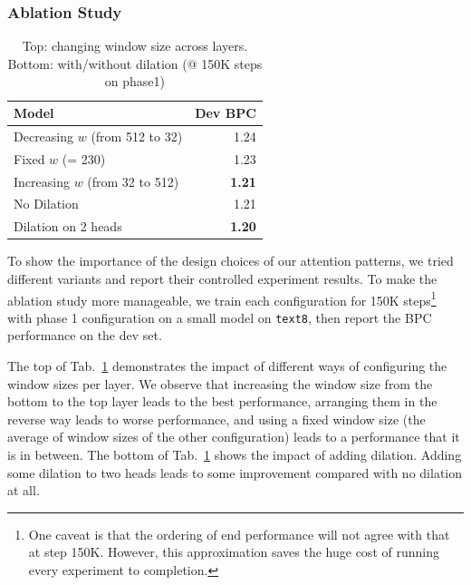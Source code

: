 \subsubsection{Ablation Study}

\begin{table}[t]
    \centering
    \small
    \begin{tabular}{@{}lr@{}}
    \toprule
    Model & Dev BPC \\
    \midrule
    Decreasing $w$ (from 512 to 32) & 1.24 \\
    Fixed $w$ (= 230) &  1.23 \\
    Increasing $w$ (from 32 to 512) &\textbf{ 1.21} \\
    \midrule
    No Dilation &  1.21 \\
    Dilation on 2 heads &  \textbf{1.20} \\
    \bottomrule
    \end{tabular}
    \caption{Top: changing window size
    across layers. Bottom: with/without dilation (@ 150K steps on phase1)}
    \label{tab:ablation_charlm}
\end{table}






To show the importance of the design choices of our attention patterns, we tried different variants and report their controlled experiment results. 
To make the ablation study more manageable, we train each configuration for 150K steps\footnote{
One caveat is that the ordering of end performance will not agree with that at step 150K.
However, this approximation saves the huge cost of running every experiment to completion.}
with phase 1 configuration on a small model on \texttt{text8}, then report the BPC performance on the dev set. 

The top of Tab.~\ref{tab:ablation_charlm} demonstrates the impact of different ways of configuring the window sizes per layer. We observe that increasing the window size from the bottom 
to the top layer leads to the best performance, arranging them in the reverse way leads to worse performance,
and using a fixed window size (the average of window sizes of the other configuration) leads to a performance that it is in between.
The bottom of Tab.~\ref{tab:ablation_charlm} shows the impact of adding dilation.
Adding some dilation to two heads leads to some improvement compared with 
no dilation at all. 


